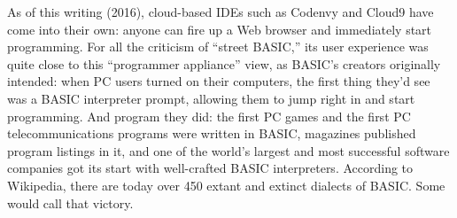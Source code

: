 As of this writing (2016), cloud-based IDEs such as Codenvy and Cloud9
have come into their own: anyone can fire up a Web browser and
immediately start programming.
For all the criticism of ``street BASIC,'' its user experience was quite
close to this ``programmer appliance'' view, as BASIC's creators
originally intended: when PC users turned on their computers, the first
thing they'd see was a BASIC interpreter prompt, allowing them to jump
right in and start programming.
And program they did: the first PC games and the first PC
telecommunications programs were written in BASIC, magazines published
program listings in it, and one of the world's largest and most
successful software companies got its start with well-crafted BASIC
interpreters.
According to Wikipedia, there are today over 450 extant and extinct
dialects of BASIC.
Some would call that victory.
